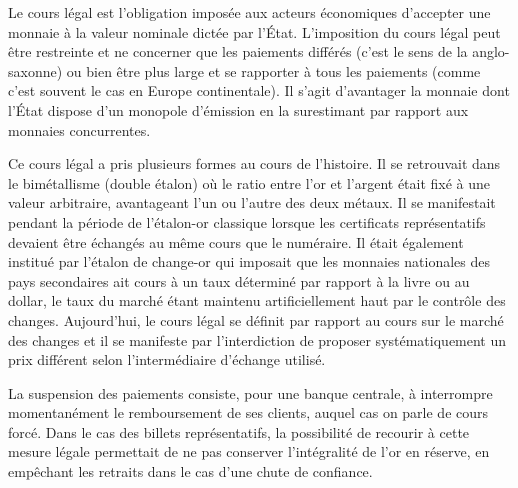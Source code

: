 Le cours légal est l'obligation imposée aux acteurs économiques d'accepter une monnaie à la valeur nominale dictée par l'État. L'imposition du cours légal peut être restreinte et ne concerner que les paiements différés (c'est le sens de la  anglo-saxonne) ou bien être plus large et se rapporter à tous les paiements (comme c'est souvent le cas en Europe continentale). Il s'agit d'avantager la monnaie dont l'État dispose d'un monopole d'émission en la surestimant par rapport aux monnaies concurrentes.

Ce cours légal a pris plusieurs formes au cours de l'histoire. Il se retrouvait dans le bimétallisme (double étalon) où le ratio entre l'or et l'argent était fixé à une valeur arbitraire, avantageant l'un ou l'autre des deux métaux. Il se manifestait pendant la période de l'étalon-or classique lorsque les certificats représentatifs devaient être échangés au même cours que le numéraire. Il était également institué par l'étalon de change-or qui imposait que les monnaies nationales des pays secondaires ait cours à un taux déterminé par rapport à la livre ou au dollar, le taux du marché étant maintenu artificiellement haut par le contrôle des changes. Aujourd'hui, le cours légal se définit par rapport au cours sur le marché des changes et il se manifeste par l'interdiction de proposer systématiquement un prix différent selon l'intermédiaire d'échange utilisé. %

La suspension des paiements consiste, pour une banque centrale, à interrompre momentanément le remboursement de ses clients, auquel cas on parle de cours forcé. Dans le cas des billets représentatifs, la possibilité de recourir à cette mesure légale permettait de ne pas conserver l'intégralité de l'or en réserve, en empêchant les retraits dans le cas d'une chute de confiance.


